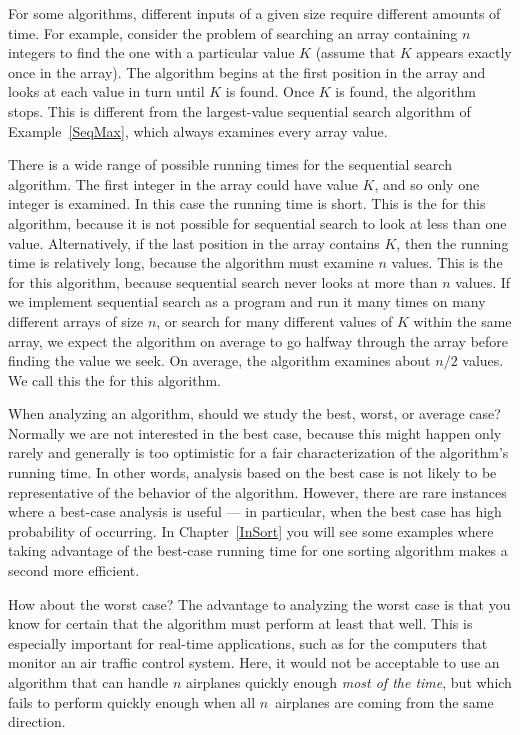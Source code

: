 For some algorithms, different inputs of a given size require
different amounts of time.
For example, consider the problem of searching an array containing
\(n\) integers to find the one with a particular value \(K\)
(assume that \(K\) appears exactly once in the array).
The  algorithm begins
at the first position in the array and looks at each value in turn
until \(K\) is found.
Once \(K\) is found, the algorithm stops.
This is different from the largest-value sequential search
algorithm of Example~\ref{SeqMax}, which always examines every array
value.

There is a wide range of possible running
times for the sequential search algorithm.
The first integer in the array could have value \(K\), and so only one
integer is examined.
In this case the running time is short.
This is the  for this algorithm, because it is not
possible for sequential search to look at less than one value.
Alternatively, if the last position in the array contains \(K\),
then the running time is relatively long, because the algorithm
must examine \(n\) values.
This is the  for
this algorithm, because sequential search never looks at more than
\(n\) values.
If we implement sequential search as a program and run it many times
on many different arrays of size \(n\),
or search for many different values of \(K\) within the same array,
we expect the algorithm on average to go halfway through the array
before finding the value we seek.
On average, the algorithm examines about \(n/2\) values.
We call this the  for this algorithm.

When analyzing an algorithm, should we study the best, worst, or
average case?
Normally we are not interested in the best case, because this might
happen only rarely and generally is too optimistic for a fair
characterization of the algorithm's running time.
In other words, analysis based on the best case is not likely to be
representative of the behavior of the algorithm.
However, there are rare instances where a best-case analysis is
useful --- in particular, when the best case has high probability of
occurring.
In Chapter~\ref{InSort} you will see some examples
where taking advantage of the best-case running time for one sorting
algorithm makes a second more efficient.

How about the worst case?
The advantage to analyzing the worst case is that you know for
certain that the algorithm must perform at least that well.
This is especially important for real-time applications,
such as for the computers that monitor an air traffic control system.
Here, it would not be acceptable to use an algorithm that can handle
\(n\) airplanes quickly enough \emph{most of the time}, but which
fails to perform quickly enough when all \(n\)~airplanes are coming
from the same direction.

